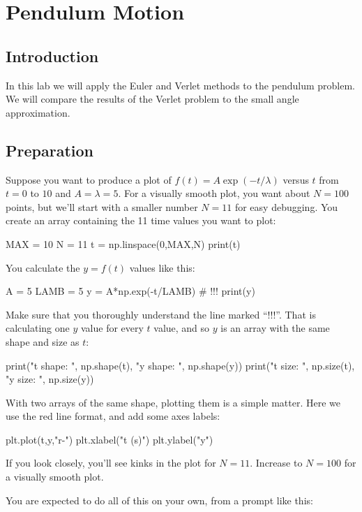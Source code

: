 \chapter{Pendulum Motion}

\section{Introduction}

In this lab we will apply the Euler and Verlet methods to the pendulum
problem.  We will compare the results of the Verlet problem to the
small angle approximation.

\section{Preparation}

Suppose you want to produce a plot of $f(t) = A \exp(-t/\lambda)$
versus $t$ from $t=0$ to $10$ and $A=\lambda=5$.  For a visually
smooth plot, you want about $N=100$ points, but we'll start with a
smaller number $N=11$ for easy debugging.  You create an array containing the 11
time values you want to plot:
\begin{python}
MAX = 10
N = 11
t = np.linspace(0,MAX,N)
print(t)
\end{python}
You calculate the $y = f(t)$ values like this:
\begin{python}
A    = 5
LAMB = 5
y = A*np.exp(-t/LAMB)  # !!!
print(y)
\end{python}
Make sure that you thoroughly understand the line marked ``!!!''.  That is
calculating one $y$ value for every $t$ value, and so $y$ is an array
with the same shape and size as $t$:
\begin{python}
print("t shape: ", np.shape(t), "y shape: ", np.shape(y))
print("t size:  ", np.size(t),  "y size: ", np.size(y))
\end{python}
With two arrays of the same shape, plotting them is a simple matter.  Here we use the red line format, and add some axes labels:
\begin{python}
plt.plot(t,y,"r-")
plt.xlabel("t (s)")
plt.ylabel("y")
\end{python}
If you look closely, you'll see kinks in the plot for $N=11$.  Increase to $N=100$ for a visually smooth plot.

\newpage

You are expected to do all of this on your own, from a prompt like this:\\

